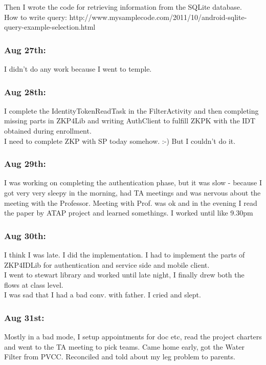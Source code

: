 \documentclass[11pt]{article}
\begin{document}
Then I wrote the code for retrieving information from the SQLite database.\\
How to write query: http://www.mysamplecode.com/2011/10/android-sqlite-query-example-selection.html\\

\subsubsection*{Aug 27th:}
I didn't do any work because I went to temple.\\

\subsubsection*{Aug 28th:}
I complete the IdentityTokenReadTask in the FilterActivity and then completing missing parts in ZKP4Lib and writing AuthClient to fulfill ZKPK with 
the IDT obtained during enrollment.\\

I need to complete ZKP with SP today somehow. :-)
But I couldn't do it.

\subsubsection*{Aug 29th:}
I was working on completing the authentication phase, but it was slow - because I got very very sleepy in the morning, had TA meetings and was 
nervous about the meeting with the Professor.
Meeting with Prof. was ok and in the evening I read the paper by ATAP project and learned somethings. I worked until like 9.30pm\\ 

\subsubsection*{Aug 30th:}
I think I was late. I did the implementation. I had to implement the parts of ZKP4IDLib for authentication and service side and mobile client.\\
I went to stewart library and worked until late night, I finally drew both the flows at class level.\\
I was sad that I had a bad conv. with father. I cried and slept.\\

\subsubsection*{Aug 31st:}
Mostly in a bad mode, I setup appointments for doc etc, read the project charters and went to the TA meeting to pick teams. Came home early, got the 
Water Filter from PVCC. Reconciled and told about my leg problem to parents.
\end{document}
